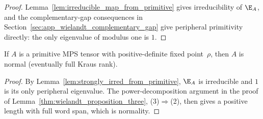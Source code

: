 \begin{proof}
    \leanok
    Lemma~\ref{lem:irreducible_map_from_primitive} gives irreducibility of
    $\E_A$, and the complementary-gap consequences in
    Section~\ref{sec:app_wielandt_complementary_gap} give peripheral
    primitivity directly: the only eigenvalue of modulus one is $1$.
\end{proof}

\begin{lemma}%
    \label{thm:normal_from_primitive_posdef}
    \leanok
    If $A$ is a primitive MPS tensor with positive-definite fixed point~$\rho$,
    then $A$ is normal (eventually full Kraus rank).
\end{lemma}

\begin{proof}
    \leanok
    By Lemma~\ref{lem:strongly_irred_from_primitive}, $\E_A$ is irreducible
    and $1$ is its only peripheral eigenvalue. The power-decomposition
    argument in the proof of Lemma~\ref{thm:wielandt_proposition_three},
    (3)$\Rightarrow$(2), then gives a positive length with full word span,
    which is normality.
\end{proof}
